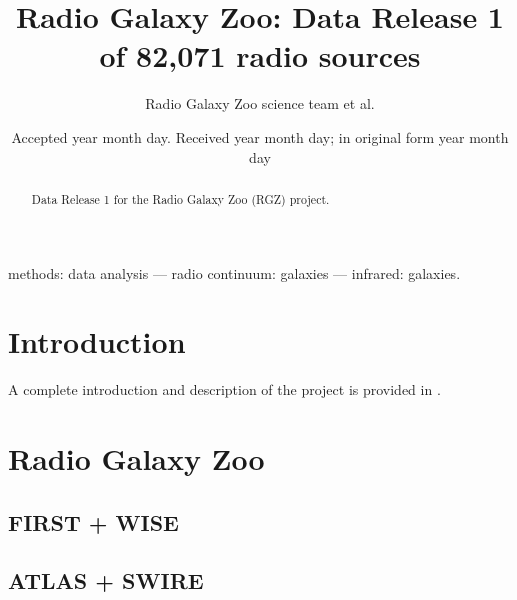 \documentclass[a4,useAMS,usenatbib]{mn2e}
\title[Radio Galaxy Zoo]{Radio Galaxy Zoo: Data Release 1 of 82,071 radio sources}
\author[RGZ team]{Radio Galaxy Zoo science team et al.
}
\begin{document}
\date{Accepted year month day. Received year month day; in original form year month day}

\pagerange{\pageref{firstpage}--\pageref{lastpage}} 

\maketitle

\label{firstpage}

\begin{abstract}
Data Release 1 for the Radio Galaxy Zoo (RGZ) project.
\end{abstract}
\begin{keywords}
methods: data analysis --- radio continuum: galaxies --- infrared: galaxies. 
\end{keywords}

\section{Introduction}\label{sec:intro}

A complete introduction and description of the project is provided in \citet[][hereafter B15]{ban15}. 

\section{Radio Galaxy Zoo}\label{sec:sample}

\subsection{FIRST + WISE}\label{ssec:sample_first}

\subsection{ATLAS + SWIRE}\label{ssec:sample_atlas}
\end{document}
